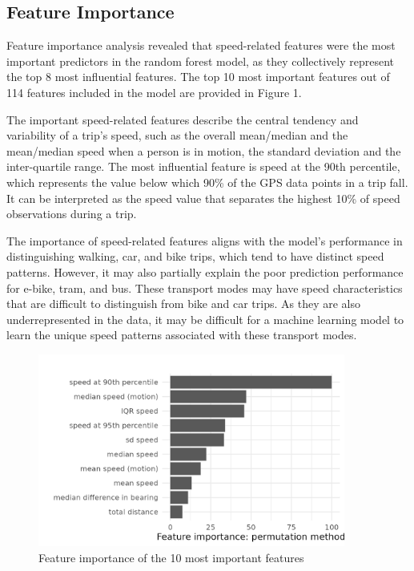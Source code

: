 \documentclass[10pt, a4paper, titlepage, hidelinks]{article}
\begin{document}
\subsection{Feature Importance}

Feature importance analysis revealed that speed-related features were the most important predictors in the random forest model, as they collectively represent the top 8 most influential features. The top 10 most important features out of 114 features included in the model are provided in Figure 1.

The important speed-related features describe the central tendency and variability of a trip's speed, such as the overall mean/median and the mean/median speed when a person is in motion, the standard deviation and the inter-quartile range. The most influential feature is speed at the 90th percentile, which represents the value below which 90\% of the GPS data points in a trip fall. It can be interpreted as the speed value that separates the highest 10\% of speed observations during a trip.

The importance of speed-related features aligns with the model's performance in distinguishing walking, car, and bike trips, which tend to have distinct speed patterns. However, it may also partially explain the poor prediction performance for e-bike, tram, and bus. These transport modes may have speed characteristics that are difficult to distinguish from bike and car trips. As they are also underrepresented in the data, it may be difficult for a machine learning model to learn the unique speed patterns associated with these transport modes.

\begin{figure}
    \centering
    \caption{Feature importance of the 10 most important features}
    \vspace{-0.5cm}
    \includegraphics[width=0.9\textwidth]{varimp_plot.png}
    \end{figure}
\end{document}
